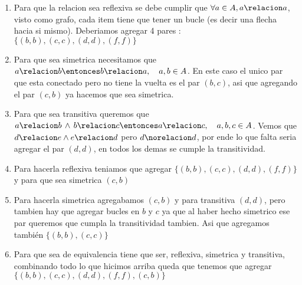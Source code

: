 \begin{enumerate}[label=\roman*)]
 \item Para que la relacion sea reflexiva se debe cumplir que $\forall a \in A, a \relacion a$, visto como grafo, 
 cada item tiene que tener un bucle (es decir una flecha hacia si mismo). Deberiamos agregar 4 pares : $\{(b,b),(c,c),(d,d),(f,f)\}$
 \item Para que sea simetrica necesitamos que $a \relacion b \entonces b \relacion a, \quad a,b \in A$. En este caso el unico par que esta 
 conectado pero no tiene la vuelta es el par $(b,c)$, asi que agregando el par $(c,b)$ ya hacemos que sea simetrica.  
 \item Para que sea transitiva queremos que $a \relacion b \, \land \, b \relacion c \entonces a \relacion c, \quad a,b,c \in A$. Vemos que 
 $d \relacion e \land e \relacion d$ pero $d \norelacion d$, por ende lo que falta seria agregar el par $(d,d)$, en todos los demas se cumple la transitividad.
 \item Para hacerla reflexiva teniamos que agregar $\{(b,b),(c,c),(d,d),(f,f)\}$ y para que sea simetrica $(c,b)$
 \item Para hacerla simetrica agregabamos $(c,b)$ y para transitiva $(d,d)$, pero tambien hay que agregar bucles en $b$ y $c$ ya que al haber 
 hecho simetrico ese par queremos que cumpla la transitividad tambien. Asi que agregamos también $\{(b,b),(c,c)\}$
 \item Para que sea de equivalencia tiene que ser, reflexiva, simetrica y transitiva, combinando todo lo que hicimos arriba queda 
 que tenemos que agregar $\{(b,b),(c,c),(d,d),(f,f),(c,b)\}$
\end{enumerate}

\begin{aportes}
 \item {}
\end{aportes}
